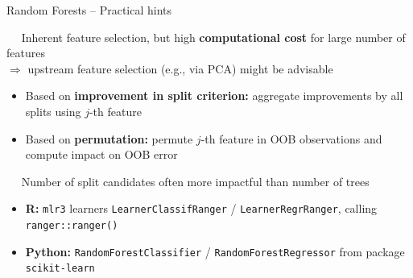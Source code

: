 \begin{frame}{Random Forests -- Practical hints}

 ~~ Inherent feature selection, but high 
\textbf{computational cost} for large number of features \\
$\Rightarrow$ upstream feature selection (e.g., via PCA) might be advisable

\medskip


\begin{itemize}
  \item Based on \textbf{improvement in split criterion:} aggregate improvements 
  by all splits using $j$-th feature
  \item Based on \textbf{permutation:} permute $j$-th feature in 
  OOB observations and compute impact on OOB error
\end{itemize}

\medskip

 ~~ Number of split candidates often more impactful than 
number of trees

\medskip


\begin{itemize}
  \item \textbf{R:} \texttt{mlr3} learners \texttt{LearnerClassifRanger} / 
    \texttt{LearnerRegrRanger}, calling \texttt{ranger::ranger()}
  \item \textbf{Python:} \texttt{RandomForestClassifier} / 
  \texttt{RandomForestRegressor} from package \texttt{scikit-learn}
\end{itemize}

\end{frame}